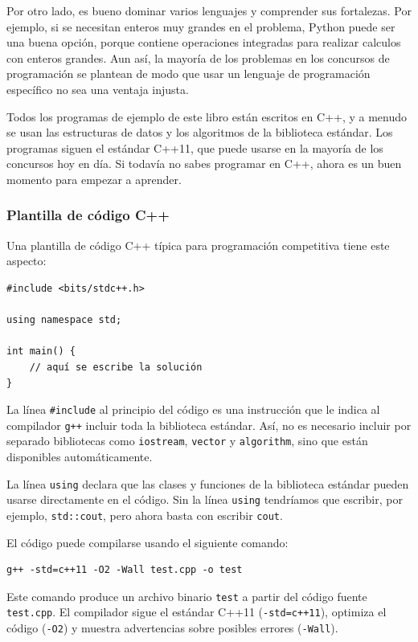 Por otro lado, es bueno
dominar varios lenguajes y comprender
sus fortalezas.
Por ejemplo, si se necesitan enteros muy grandes
en el problema,
Python puede ser una buena opción, porque
contiene operaciones integradas para
realizar calculos con enteros grandes.
Aun así, la mayoría de los problemas en los concursos de programación
se plantean de modo que usar un lenguaje de programación específico
no sea una ventaja injusta.

Todos los programas de ejemplo de este libro están escritos en C++,
y a menudo se usan las estructuras de datos y los algoritmos de la biblioteca estándar.
Los programas siguen el estándar C++11,
que puede usarse en la mayoría de los concursos hoy en día.
Si todavía no sabes programar en C++,
ahora es un buen momento para empezar a aprender.

\subsubsection{Plantilla de código C++}

Una plantilla de código C++ típica para programación competitiva
tiene este aspecto:

\begin{lstlisting}
#include <bits/stdc++.h>

using namespace std;

int main() {
    // aquí se escribe la solución
}
\end{lstlisting}

La línea \texttt{\#include} al principio
del código es una instrucción que le indica al compilador \texttt{g++}
 incluir toda la biblioteca estándar.
Así, no es necesario incluir por separado
bibliotecas como \texttt{iostream},
\texttt{vector} y \texttt{algorithm},
sino que están disponibles automáticamente.

La línea \texttt{using} declara
que las clases y funciones
de la biblioteca estándar pueden usarse directamente
en el código.
Sin la línea \texttt{using} tendríamos
que escribir, por ejemplo, \texttt{std::cout},
pero ahora basta con escribir \texttt{cout}.

El código puede compilarse usando el siguiente comando:

\begin{lstlisting}
g++ -std=c++11 -O2 -Wall test.cpp -o test
\end{lstlisting}

Este comando produce un archivo binario \texttt{test}
a partir del código fuente \texttt{test.cpp}.
El compilador sigue el estándar C++11
(\texttt{-std=c++11}),
optimiza el código (\texttt{-O2})
y muestra advertencias sobre posibles errores (\texttt{-Wall}).

